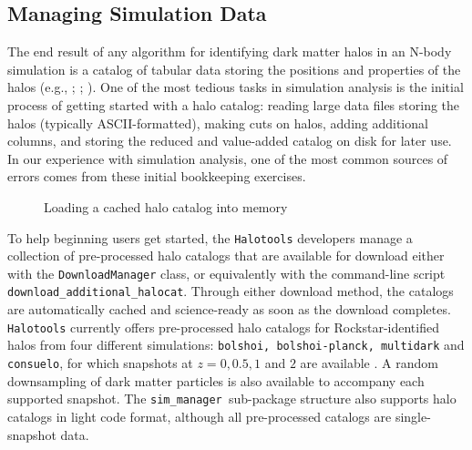 \documentclass[twocolumn, tighten]{aastex6}
\newcommand{\sims}{{\tt sim\_manager }}
\begin{document}
\subsection{Managing Simulation Data}
\label{subsection:sim_manager}

The end result of any algorithm for identifying dark matter halos in an N-body simulation is a catalog of tabular data storing the positions and properties of the halos (e.g., \citealt[][{\tt BDM}]{klypin_holtzman97}; \citealt[][{\tt SUBFIND}]{springel_etal01}; \citealt[][{\tt ROCKSTAR}]{behroozi_rockstar11}). One of the most tedious tasks in simulation analysis is the initial process of getting started with a halo catalog: reading large data files storing the halos (typically ASCII-formatted), making cuts on halos, adding additional columns, and storing the reduced and value-added catalog on disk for later use. In our experience with simulation analysis, one of the most common sources of errors comes from these initial bookkeeping exercises.

\begin{figure}
\center
\caption{Loading a cached halo catalog into memory\label{code:cachedsim}}
\vspace{0.1in}
\end{figure}

To help beginning users get started, the {\tt Halotools} developers manage a collection of pre-processed halo catalogs that are available for download either with the {\tt DownloadManager} class, or equivalently with the command-line script {\tt download\_additional\_halocat}. Through either download method, the catalogs are automatically cached and science-ready as soon as the download completes. {\tt Halotools} currently offers pre-processed halo catalogs for Rockstar-identified halos from four different simulations: {\tt bolshoi, bolshoi-planck, multidark} and {\tt consuelo}, for which snapshots at $z=0, 0.5, 1$ and $2$ are available \citep{gottloeber_klypin08, bolshoi_11, riebe_etal11, lasdamas}. A random downsampling of dark matter particles is also available to accompany each supported snapshot. The \sims sub-package structure also supports halo catalogs in light code format, although all pre-processed catalogs are single-snapshot data. 
\end{document}
